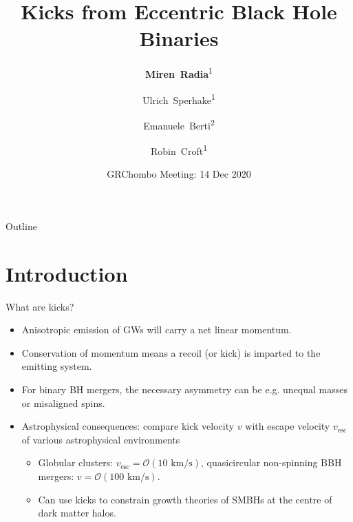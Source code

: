 \documentclass[smaller,aspectratio=169]{beamer}
\title[Eccentric Kicks] %
{Kicks from Eccentric Black Hole Binaries}
\author{
    \textbf{Miren~Radia}\textsuperscript{{1}} \and 
    Ulrich~Sperhake\textsuperscript{1} \and 
    Emanuele~Berti\textsuperscript{2} \and 
    Robin~Croft\textsuperscript{1}}
\institute
{
    \textsuperscript{1} Department of Applied Mathematics \& 
    Theoretical Physics, University of Cambridge\\
    \textsuperscript{2} Department of Physics \& Astronomy, 
    Johns Hopkins University
}
\date{GRChombo Meeting: 14 Dec 2020}
\begin{document}
\begin{frame}
  \titlepage
\end{frame}

\begin{frame}{Outline}
  \tableofcontents
\end{frame}





\section{Introduction}

\begin{frame}{What are kicks?}
    \begin{itemize}
        \item 
            \alert{Anisotropic} emission of GWs will carry a net linear momentum.
        \item
            Conservation of momentum means a recoil (or \alert{kick}) 
            is imparted to the emitting system.
        \item
            For binary BH mergers, the necessary \alert{asymmetry} can be 
            e.g. unequal masses or misaligned spins.
        \item
            Astrophysical consequences: compare kick velocity $v$ with escape 
            velocity $v_{\text{esc}}$ of various astrophysical environments
            \begin{itemize}
                \item 
                    Globular clusters: $v_{\text{esc}}=\mathcal{O}(10\text{ km/s})$,
                    quasicircular non-spinning BBH mergers: $v = \mathcal{O}(100\text{ km/s})$.
                \item
                    Can use kicks to constrain growth theories of 
                    SMBHs at the centre of dark matter halos.
            \end{itemize}
    \end{itemize}
\end{frame}
\end{document}

